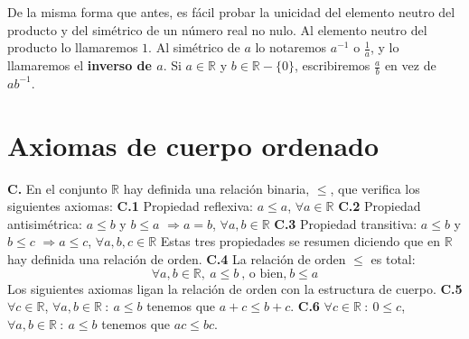 De la misma forma que antes, es fácil probar la unicidad del elemento neutro del producto y
del simétrico de un número real no nulo. Al elemento neutro del producto lo llamaremos $1$.
Al simétrico de $a$ lo notaremos $a^{-1}$ o $\frac{1}{a}$, y lo llamaremos el \textbf{inverso de $a$}.
Si $a \in \mathbb{R}$ y $b \in \mathbb{R}-\{0\}$, escribiremos $\frac{a}{b}$ en vez de $ab^{-1}$.


\section{Axiomas de cuerpo ordenado}
\textbf{C.}\label{Axioma_C} En el conjunto $\mathbb{R}$ hay definida una relación binaria, $\leq$, que verifica los
siguientes axiomas:
\newline
\newline
\hspace*{1cm} \textbf{C.1} Propiedad reflexiva: $a \leq a$, $\forall a \in \mathbb{R}$
\newline
\newline
\hspace*{1cm} \textbf{C.2} Propiedad antisimétrica: $a \leq b$ y $b \leq a$ $\Longrightarrow a = b$, $\forall a,b \in \mathbb{R}$
\newline
\newline
\hspace*{1cm} \textbf{C.3} Propiedad transitiva: $a \leq b$ y $b \leq c$ $\Longrightarrow a \leq c$, $\forall a,b,c \in \mathbb{R}$
\newline
\newline
Estas tres propiedades se resumen diciendo que en $\mathbb{R}$ hay definida una relación de orden.
\newline
\newline
\hspace*{1cm} \textbf{C.4} La relación de orden $\leq$ es total:
\begin{equation*}
    \forall a,b \in \mathbb{R},~a \leq b ~\text{, o bien,}~ b \leq a
\end{equation*}
Los siguientes axiomas ligan la relación de orden con la estructura de cuerpo.
\newline
\newline
\hspace*{1cm} \textbf{C.5} $\forall c \in \mathbb{R}$, $\forall a,b \in \mathbb{R} ~:~ a \leq b$ tenemos que $a+c \leq b+c$.
\newline
\newline
\hspace*{1cm} \textbf{C.6} $\forall c \in \mathbb{R} ~:~ 0 \leq c$, $\forall a,b \in \mathbb{R} ~:~ a \leq b$ tenemos que
$ac \leq bc$.


